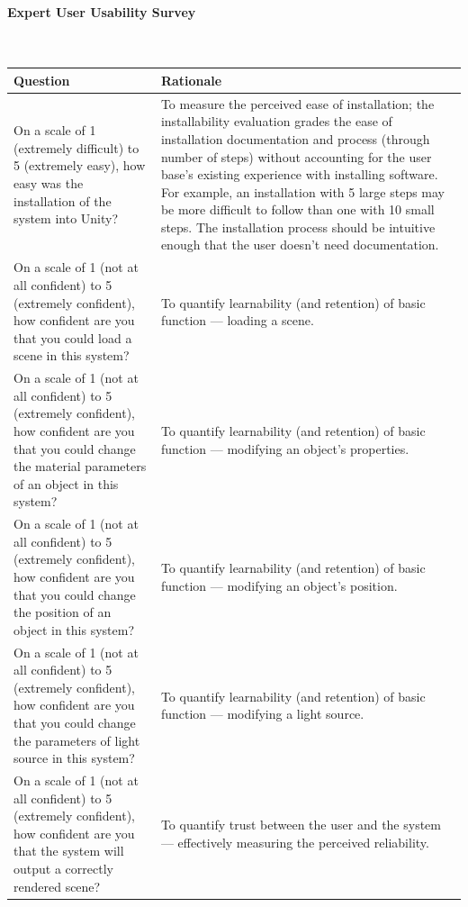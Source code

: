 \documentclass[12pt, titlepage]{article}
\begin{document}
\paragraph{Expert User Usability Survey}\label{survey:expert}
~\newline
\begin{tabular}{p{8cm}|p{8cm}}
	\hline
	\textbf{Question} & \textbf{Rationale} \\
	\hline
	On a scale of 1 (extremely difficult) to 5 (extremely easy), how easy was 
	the installation of the system into Unity? & To measure the perceived ease 
	of installation; the installability evaluation grades the ease of 
	installation documentation and process (through number of steps) without 
	accounting for the user base's existing experience with installing 
	software. For example, an installation with 5 large steps may be more 
	difficult to follow than one with 10 small steps. The installation process 
	should be intuitive enough that the user doesn't need documentation.\\
	On a scale of 1 (not at all confident) to 5 (extremely confident), how 
	confident are you that you could load a scene in this system? & To quantify 
	learnability (and retention) of basic function --- loading a scene. \\
	On a scale of 1 (not at all confident) to 5 (extremely confident), how 
	confident are you that you could change the material parameters of an 
	object in this system? & To quantify learnability (and retention) of basic 
	function --- modifying an object's properties. \\
	On a scale of 1 (not at all confident) to 5 (extremely confident), how 
	confident are you that you could change the position of an object in this 
	system? & To quantify learnability (and retention) of basic function --- 
	modifying an object's position. \\	
	On a scale of 1 (not at all confident) to 5 (extremely confident), how 
	confident are you that you could change the parameters of light source in 
	this system? & To quantify learnability (and retention) of basic function 
	--- modifying a light source. \\	
	On a scale of 1 (not at all confident) to 5 (extremely confident), how 
	confident are you that the system will output a correctly rendered scene? & 
	To quantify trust between the user and the system --- effectively measuring 
	the perceived reliability. \\

\end{tabular}
\end{document}
